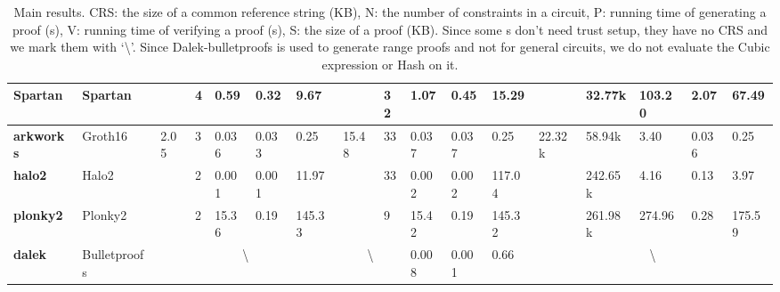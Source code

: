 \documentclass[letterpaper,twocolumn,10pt]{article}
\theoremstyle{definition}
\newcommand{\zk}{\text{zk-SNARK}\xspace}
\begin{document}
\begin{table*}[t]
{\begin{threeparttable}
\begin{tabular}{ll|lllll|lllll|lllll}
				\midrule
				\textbf{Spartan} & \small{Spartan} &\makecell[c]{\textbackslash} &4 &0.59 &0.32 &9.67 &\makecell[c]{\textbackslash} &32 &1.07 &0.45 &15.29 &\makecell[c]{\textbackslash} &32.77k &103.20 &2.07 &67.49 \\
				
				\midrule
				\textbf{arkworks} & \small{Groth16} &2.05 &3 &0.036 &0.033 &0.25 &15.48 &33 &0.037 &0.037 &0.25 &22.32k &58.94k &3.40 &0.036 &0.25 \\
				
				\midrule
				\textbf{halo2} & \small{Halo2} &\makecell[c]{\textbackslash} &2 &0.001 &0.001 &11.97 &\makecell[c]{\textbackslash} &33 &0.002 &0.002 &117.04 &\makecell[c]{\textbackslash} &242.65k &4.16 &0.13 &3.97 \\
				
				\midrule
				\textbf{plonky2} & \small{Plonky2} &\makecell[c]{\textbackslash} &2 &15.36 &0.19 &145.33 &\makecell[c]{\textbackslash} &9 &15.42 &0.19 &145.32 &\makecell[c]{\textbackslash} &261.98k &274.96 &0.28 &175.59 \\
				
				\midrule
				\textbf{dalek}& \small{Bulletproofs} 
				&\multicolumn{5}{c|}{\textbackslash}
				&\multicolumn{2}{c}{\textbackslash} &0.008 &0.001 &0.66 &\multicolumn{5}{c}{\textbackslash} \\
				\bottomrule
			\end{tabular}%
		\end{threeparttable}
	}
	\caption{{Main results.
			CRS: the size of a common reference string (KB), N: the number of constraints in a circuit, P: running time of generating a proof (s), V: running time of verifying a proof (s), S: the size of a proof (KB). Since some {\zk}s don't need trust setup, they have no CRS and we mark them with `\textbackslash'. Since Dalek-bulletproofs is used to generate range proofs and not for general circuits, we do not evaluate the Cubic expression or Hash on it.}}
	\label{tab:stat}
\end{table*}
\end{document}
